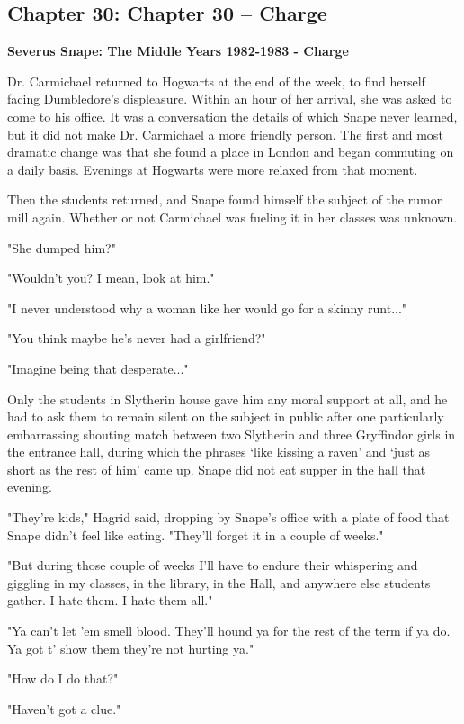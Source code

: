 \documentclass[a4paper,11pt]{article}
\begin{document}
\subsection{Chapter 30: Chapter 30 – Charge}

\textbf{Severus Snape: The Middle Years 1982-1983 - Charge}

Dr. Carmichael returned to Hogwarts at the end of the week, to find herself facing Dumbledore's displeasure. Within an hour of her arrival, she was asked to come to his office. It was a conversation the details of which Snape never learned, but it did not make Dr. Carmichael a more friendly person. The first and most dramatic change was that she found a place in London and began commuting on a daily basis. Evenings at Hogwarts were more relaxed from that moment.

Then the students returned, and Snape found himself the subject of the rumor mill again. Whether or not Carmichael was fueling it in her classes was unknown.

"She dumped him?"

"Wouldn't you? I mean, look at him."

"I never understood why a woman like her would go for a skinny runt..."

"You think maybe he's never had a girlfriend?"

"Imagine being that desperate..."

Only the students in Slytherin house gave him any moral support at all, and he had to ask them to remain silent on the subject in public after one particularly embarrassing shouting match between two Slytherin and three Gryffindor girls in the entrance hall, during which the phrases `like kissing a raven' and `just as short as the rest of him' came up. Snape did not eat supper in the hall that evening.

"They're kids," Hagrid said, dropping by Snape's office with a plate of food that Snape didn't feel like eating. "They'll forget it in a couple of weeks."

"But during those couple of weeks I'll have to endure their whispering and giggling in my classes, in the library, in the Hall, and anywhere else students gather. I hate them. I hate them all."

"Ya can't let 'em smell blood. They'll hound ya for the rest of the term if ya do. Ya got t' show them they're not hurting ya."

"How do I do that?"

"Haven't got a clue."
\end{document}
